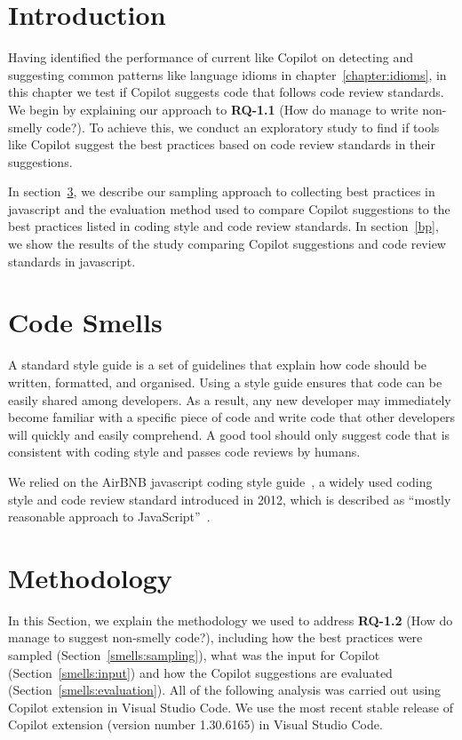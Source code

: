 \label{chapter:smells}

\section{Introduction}
Having identified the performance of current \cct{} like Copilot on detecting and suggesting common patterns like language idioms in chapter~\ref{chapter:idioms}, in this chapter we test if Copilot suggests code that follows code review standards.
We begin by explaining our approach to \textbf{RQ-1.1} (How do \cct{} manage to write non-smelly code?). To achieve this, we conduct an exploratory study to find if \cct{} tools like Copilot suggest the best practices based on code review standards in their suggestions. 

In section~\ref{smells:methodology}, we describe our sampling approach to collecting best practices in javascript and the evaluation method used to compare Copilot suggestions to the best practices listed in coding style and code review standards. 
In section~\ref{bp}, we show the results of the study comparing Copilot suggestions and code review standards in javascript.

\section{Code Smells}
\label{smells}
A standard style guide is a set of guidelines that explain how code should be written, formatted, and organised. 
Using a style guide ensures that code can be easily shared among developers. As a result, any new developer may immediately become familiar with a specific piece of code and write code that other developers will quickly and easily comprehend.
A good \cct{} tool should only suggest code that is consistent with coding style and passes code reviews by humans. 

We relied on the AirBNB javascript coding style guide~\cite{airbnb_code}, a widely used coding style and code review standard introduced in 2012, which is described as ``mostly reasonable approach to JavaScript''~\cite{airbnb_code}.

\section{Methodology}
\label{smells:methodology}
In this Section, we explain the methodology we used to address \textbf{RQ-1.2} (How do \cct{} manage to suggest non-smelly code?), including how the best practices were sampled (Section~\ref{smells:sampling}), what was the input for Copilot (Section~\ref{smells:input}) and how the Copilot suggestions are evaluated (Section~\ref{smells:evaluation}). All of the following analysis was carried out using Copilot extension in Visual Studio Code. We use the most recent stable release of Copilot extension (version number 1.30.6165) in Visual Studio Code.

